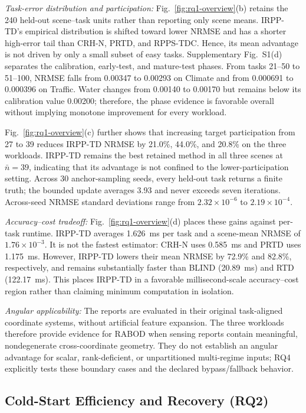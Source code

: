 \documentclass[journal]{IEEEtran}
\begin{document}
\textit{Task-error distribution and participation:}
Fig.~\ref{fig:rq1-overview}(b) retains the 240 held-out scene--task units rather
than reporting only scene means. IRPP-TD's empirical distribution is shifted
toward lower NRMSE and has a shorter high-error tail than CRH-N, PRTD, and
RPPS-TDC. Hence, its mean advantage is not driven by only a small subset of
easy tasks. Supplementary Fig.~S1(d) separates the calibration, early-test, and
mature-test phases. From tasks 21--50 to 51--100, NRMSE falls from 0.00347 to
0.00293 on Climate and from 0.000691 to 0.000396 on Traffic. Water changes from
0.00140 to 0.00170 but remains below its calibration value 0.00200; therefore,
the phase evidence is favorable overall without implying monotone improvement
for every workload.

Fig.~\ref{fig:rq1-overview}(c) further shows that increasing target
participation from 27 to 39 reduces IRPP-TD NRMSE by 21.0\%, 44.0\%, and
20.8\% on the three workloads. IRPP-TD remains the best retained method in all
three scenes at \(\bar n=39\), indicating that its advantage is not confined to
the lower-participation setting. Across 30 anchor-sampling seeds, every held-out
task returns a finite truth; the bounded update averages 3.93 and never exceeds
seven iterations. Across-seed NRMSE standard deviations range from
\(2.32\times10^{-6}\) to \(2.19\times10^{-4}\).

\textit{Accuracy--cost tradeoff:}
Fig.~\ref{fig:rq1-overview}(d) places these gains against per-task runtime.
IRPP-TD averages 1.626~ms per task and a scene-mean NRMSE of
\(1.76\times10^{-3}\). It is not the fastest estimator: CRH-N uses 0.585~ms
and PRTD uses 1.175~ms. However, IRPP-TD lowers their mean NRMSE by 72.9\% and
82.8\%, respectively, and remains substantially faster than BLIND (20.89~ms)
and RTD (122.17~ms). This places IRPP-TD in a favorable millisecond-scale
accuracy--cost region rather than claiming minimum computation in isolation.

\textit{Angular applicability:}
The reports are evaluated in their original task-aligned coordinate systems,
without artificial feature expansion. The three workloads therefore provide
evidence for RABOD when sensing reports contain meaningful, nondegenerate
cross-coordinate geometry. They do not establish an angular advantage for
scalar, rank-deficient, or unpartitioned multi-regime inputs; RQ4 explicitly
tests these boundary cases and the declared bypass/fallback behavior.

\FloatBarrier
\subsection{Cold-Start Efficiency and Recovery (RQ2)}
\label{sec:rq2-feedback}
\end{document}

